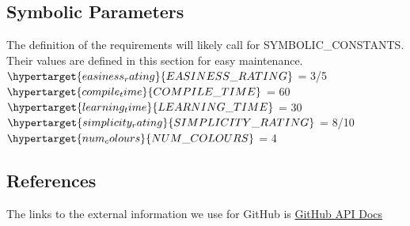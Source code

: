 \documentclass[12pt, titlepage]{article}
\begin{document}
	\subsection{Symbolic Parameters}
	
	The definition of the requirements will likely call for SYMBOLIC\_CONSTANTS.
	Their values are defined in this section for easy maintenance.\\
	
	\noindent $\hypertarget{easiness_rating}{EASINESS\_RATING}$ = 3/5 \\
	$\hypertarget{compile_time}{COMPILE\_TIME}$ = 60 \\
	$\hypertarget{learning_time}{LEARNING\_TIME}$  = 30\\
	$\hypertarget{simplicity_rating}{SIMPLICITY\_RATING}$ = 8/10\\
	$\hypertarget{num_colours}{NUM\_COLOURS}$ = 4\\
	
	\subsection{References}
	
	The links to the external information we use for GitHub is \href{https://docs.github.com/en}{GitHub API Docs}
	
	
\end{document}
